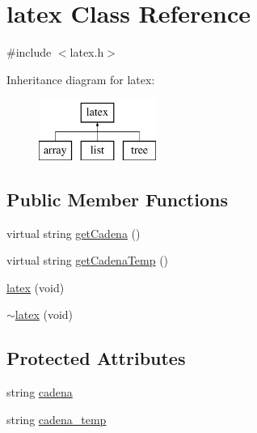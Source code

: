 \hypertarget{classlatex}{\section{latex Class Reference}
\label{classlatex}
}


{\ttfamily \#include $<$latex.\-h$>$}

Inheritance diagram for latex\-:\begin{figure}[H]
\begin{center}
\leavevmode
\includegraphics[height=2.000000cm]{classlatex}
\end{center}
\end{figure}
\subsection*{Public Member Functions}
\begin{DoxyCompactItemize}
\item 
virtual string \hyperlink{classlatex_a087cec6e7708a663c6de8fceb5028fa7}{get\-Cadena} ()
\item 
virtual string \hyperlink{classlatex_a2fc1375dd9193d6089e93848f45b577c}{get\-Cadena\-Temp} ()
\item 
\hyperlink{classlatex_aace0b094e1bd77e62505bdaa8c3f6e27}{latex} (void)
\item 
\hyperlink{classlatex_afacb95a7c4d29fa0ecb7c26bd5e383e1}{$\sim$latex} (void)
\end{DoxyCompactItemize}
\subsection*{Protected Attributes}
\begin{DoxyCompactItemize}
\item 
string \hyperlink{classlatex_ad55bec26256e48f114d250bed4a3f35d}{cadena}
\item 
string \hyperlink{classlatex_abe019c68eb9e6be93980f728ee837817}{cadena\-\_\-temp}
\end{DoxyCompactItemize}



